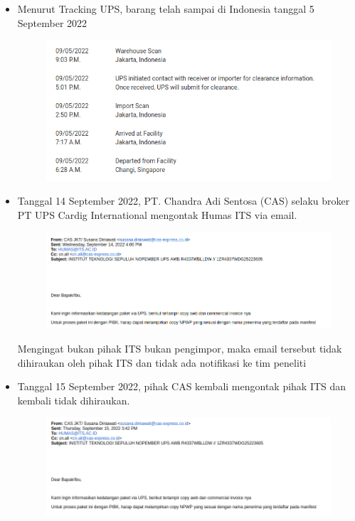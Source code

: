 \documentclass{article} %
\begin{document}
	\begin{itemize}
		\item Menurut Tracking UPS, barang telah sampai di Indonesia tanggal 5 September 2022
		
		\begin{figure}[!ht]
			\centering
			\includegraphics[width=400pt]{images/impor_0}
		\end{figure}
	
		\item Tanggal 14 September 2022, PT. Chandra Adi Sentosa (CAS) selaku broker PT UPS Cardig International mengontak Humas ITS via email.
		
		\begin{figure}[!ht]
			\centering
			\includegraphics[width=400pt]{images/impor_1}
		\end{figure}
	
		Mengingat bukan pihak ITS bukan pengimpor, maka email tersebut tidak dihiraukan oleh pihak ITS dan tidak ada notifikasi ke tim peneliti
		
		\item Tanggal 15 September 2022, pihak CAS kembali mengontak pihak ITS dan kembali tidak dihiraukan.
		
		\begin{figure}[!ht]
			\centering
			\includegraphics[width=400pt]{images/impor_2}
		\end{figure}
	

\end{itemize}
\end{document}
